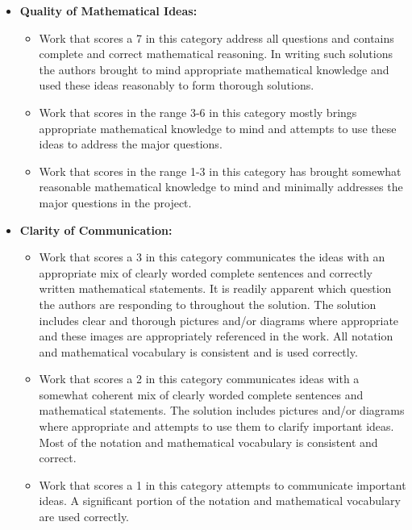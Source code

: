 \documentclass[epsf]{article}
\begin{document}
\begin{itemize}
\item {\bf Quality of Mathematical Ideas:} 
\begin{itemize}
\item Work that scores a 7 in this category address all questions and contains complete and correct mathematical reasoning.  In writing such solutions the authors brought to mind appropriate mathematical knowledge and used these ideas reasonably to form thorough solutions.  
\item Work that scores in the range 3-6 in this category mostly brings appropriate mathematical knowledge to mind and attempts to use these ideas to address the major questions.

\item Work that scores in the range 1-3 in this category has brought somewhat reasonable mathematical knowledge to mind and minimally addresses the major questions in the project.
\end{itemize}




\item {\bf Clarity of Communication:} 
\begin{itemize}
\item Work that scores a 3 in this category communicates the ideas with an appropriate mix of clearly worded complete sentences and correctly written mathematical statements.  It is readily apparent which question the authors are responding to throughout the solution.  The solution includes clear and thorough pictures and/or diagrams where appropriate and these images are appropriately referenced in the work.  All notation and mathematical vocabulary is consistent and is used correctly. 

\item Work that scores a 2 in this category communicates ideas with a somewhat coherent mix of clearly worded complete sentences and mathematical statements.  The solution includes pictures and/or diagrams where appropriate and attempts to use them to clarify important ideas.  Most of the notation and mathematical vocabulary is consistent and correct.

\item Work that scores a 1 in this category attempts to communicate important ideas.  A significant portion of the notation and mathematical vocabulary are used correctly.
\end{itemize}
\end{itemize}
\end{document}
